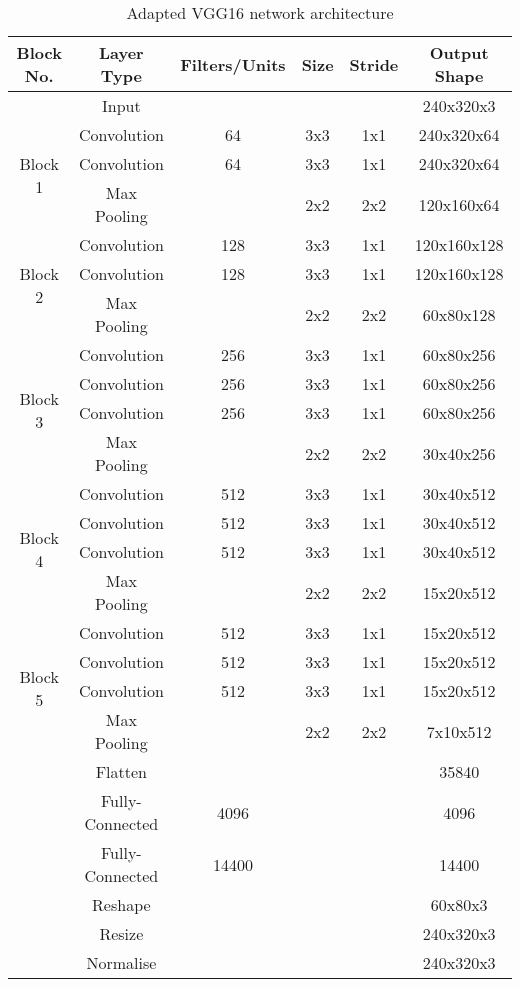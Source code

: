 \begin{table}[h]
\centering
\begin{tabular}{cccccc}
Block No. & Layer Type & Filters/Units & Size & Stride & Output Shape \\
\hline
\hline
 & Input &  &  &  & 240x320x3 \\
 \hline
\multirow{3}{3em}{Block 1} & Convolution & 64 & 3x3 & 1x1 & 240x320x64 \\
 & Convolution & 64 & 3x3 & 1x1 & 240x320x64 \\
 & Max Pooling &  & 2x2 & 2x2 & 120x160x64 \\
 \hline
\multirow{3}{3em}{Block 2} & Convolution & 128 & 3x3 & 1x1 & 120x160x128 \\
 & Convolution & 128 & 3x3 & 1x1 & 120x160x128 \\
 & Max Pooling &  & 2x2 & 2x2 & 60x80x128 \\
 \hline
\multirow{4}{3em}{Block 3} & Convolution & 256 & 3x3 & 1x1 & 60x80x256 \\
 & Convolution & 256 & 3x3 & 1x1 & 60x80x256 \\
 & Convolution & 256 & 3x3 & 1x1 & 60x80x256 \\
 & Max Pooling &  & 2x2 & 2x2 & 30x40x256 \\
 \hline
\multirow{4}{3em}{Block 4} & Convolution & 512 & 3x3 & 1x1 & 30x40x512 \\
 & Convolution & 512 & 3x3 & 1x1 & 30x40x512 \\
 & Convolution & 512 & 3x3 & 1x1 & 30x40x512 \\
 & Max Pooling &  & 2x2 & 2x2 & 15x20x512 \\
 \hline
\multirow{4}{3em}{Block 5} & Convolution & 512 & 3x3 & 1x1 & 15x20x512 \\
 & Convolution & 512 & 3x3 & 1x1 & 15x20x512 \\
 & Convolution & 512 & 3x3 & 1x1 & 15x20x512 \\
 & Max Pooling &  & 2x2 & 2x2 & 7x10x512 \\
 \hline
 & Flatten &  &  &  & 35840 \\
 & Fully-Connected & 4096 &  &  & 4096 \\
 & Fully-Connected & 14400 &  &  & 14400 \\
 & Reshape &  &  &  & 60x80x3 \\
 & Resize &  &  &  &  240x320x3 \\
 & Normalise &  &  &  &  240x320x3 \\
\end{tabular}
\caption{Adapted VGG16 network architecture}
\label{tab:vgg}
\end{table}

